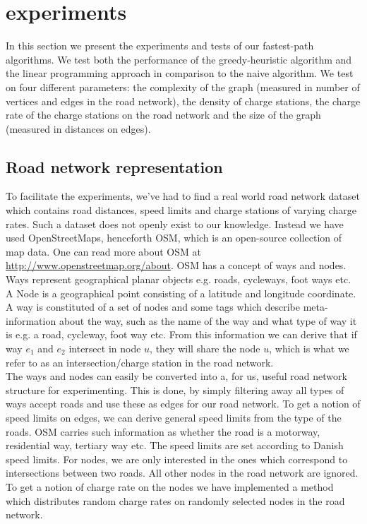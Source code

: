 \section{experiments}
\label{sec:experiments}
In this section we present the experiments and tests of our fastest-path algorithms. We test both the performance of the greedy-heuristic algorithm and the linear programming approach in comparison to the naive algorithm. We test on four different parameters: the complexity of the graph (measured in number of vertices and edges in the road network), the density of charge stations, the charge rate of the charge stations on the road network and the size of the graph (measured in distances on edges).

\subsection{Road network representation} 
\label{sub:setup}
To facilitate the experiments, we've had to find a real world road network dataset which contains road distances, speed limits and charge stations of varying charge rates. Such a dataset does not openly exist to our knowledge. Instead we have used OpenStreetMaps, henceforth OSM, which is an open-source collection of map data. One can read more about OSM at \url{http://www.openstreetmap.org/about}. OSM has a concept of ways and nodes. Ways represent geographical planar objects e.g. roads, cycleways, foot ways etc. A Node is a geographical point consisting of a latitude and longitude coordinate. A way is constituted of a set of nodes and some tags which describe meta-information about the way, such as the name of the way and what type of way it is e.g. a road, cycleway, foot way  etc. From this information we can derive that if way $e_1$ and $e_2$ intersect in node $u$, they will share the node $u$, which is what we refer to as an intersection/charge station in the road network.\\

The ways and nodes can easily be converted into a, for us, useful road network structure for experimenting. This is done, by simply filtering away all types of ways accept roads and use these as edges for our road network. To get a notion of speed limits on edges, we can derive general speed limits from the type of the roads. OSM carries such information as whether the road is a motorway, residential way, tertiary way etc. The speed limits are set according to Danish speed limits. For nodes, we are only interested in the ones which correspond to intersections between two roads. All other nodes in the road network are ignored. To get a notion of charge rate on the nodes we have implemented a method which distributes random charge rates on randomly selected nodes in the road network.

